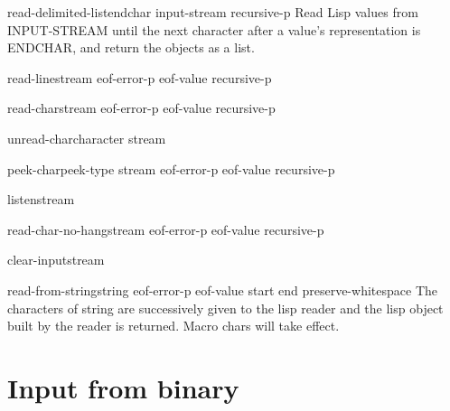 \documentclass[10pt,english]{book}
\begin{document}
\begin{function}{read-delimited-list}{endchar \op input-stream recursive-p}
  Read Lisp values from INPUT-STREAM until the next character after a
   value's representation is ENDCHAR, and return the objects as a list.
\end{function}

\begin{function}{read-line}{\op stream eof-error-p eof-value recursive-p}
  
\end{function}

\begin{function}{read-char}{\op stream eof-error-p eof-value recursive-p}
  
\end{function}

\begin{function}{unread-char}{character \op stream}
  
\end{function}

\begin{function}{peek-char}{\op peek-type stream eof-error-p eof-value recursive-p}
  
\end{function}

\begin{function}{listen}{\op stream}
  
\end{function}

\begin{function}{read-char-no-hang}{\op stream eof-error-p eof-value recursive-p}
  
\end{function}

\begin{function}{clear-input}{\op stream}
  
\end{function}

\begin{function}{read-from-string}{string \op eof-error-p eof-value \key start end preserve-whitespace}
  The characters of string are successively given to the lisp reader
   and the lisp object built by the reader is returned. Macro chars
   will take effect.
\end{function}

\section{Input from binary}
\label{sec:input-from-binary}
\end{document}
